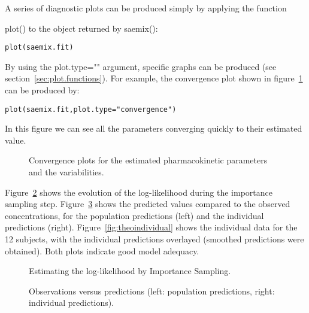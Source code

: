 A series of diagnostic plots can be produced simply by applying the function {\sf plot() to the object returned by {\sf saemix()}:
\begin{verbatim}
plot(saemix.fit)
\end{verbatim}
By using the {\sf plot.type=""} argument, specific graphs can be produced (see section~\ref{sec:plot.functions}). For example, the convergence plot shown in figure~\ref{fig:convergtheo} can be produced by:
\begin{verbatim}
plot(saemix.fit,plot.type="convergence")
\end{verbatim}
In this figure we can see all the parameters converging quickly to their estimated value.


\begin{figure}[!h]
\begin{center}
\par \kern -1cm
\end{center}
\par \kern -0.5cm
\caption{Convergence plots for the estimated pharmacokinetic parameters and the variabilities.} \label{fig:convergtheo}
\end{figure}

Figure~\ref{fig:LLIS} shows the evolution of the log-likelihood during the importance sampling step. Figure~\ref{fig:theodiagnos} shows the predicted values compared to the observed concentrations, for the population predictions (left) and the individual predictions (right). Figure~\ref{fig:theoindividual} shows the individual data for the 12 subjects, with the individual predictions overlayed (smoothed predictions were obtained). Both plots indicate good model adequacy.

\begin{figure}[!h]
\begin{center}
\par \kern -1cm
\end{center}
\par \kern -0.5cm
\caption{Estimating the log-likelihood by Importance Sampling.} \label{fig:LLIS}
\end{figure}

\begin{figure}[!h]
\begin{center}
\par \kern -0.2cm
\end{center}
\par \kern -0.8cm
\caption{Observations versus predictions (left: population predictions, right: individual predictions).} \label{fig:theodiagnos}
\end{figure}

}
